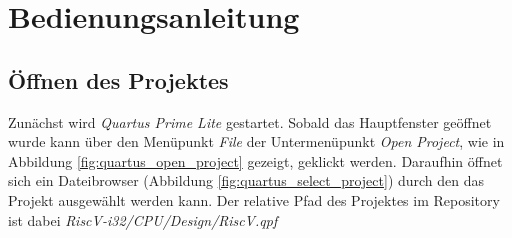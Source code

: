 \section{Bedienungsanleitung}

    \subsection{Öffnen des Projektes}
        Zunächst wird \textit{Quartus Prime Lite} gestartet.
        Sobald das Hauptfenster geöffnet wurde kann über den Menüpunkt \textit{File}
        der Untermenüpunkt \textit{Open Project}, wie in Abbildung \ref{fig:quartus_open_project} gezeigt,
        geklickt werden. Daraufhin öffnet sich ein Dateibrowser (Abbildung \ref{fig:quartus_select_project})
        durch den das Projekt ausgewählt werden kann.
        Der relative Pfad des Projektes im Repository ist dabei \textit{RiscV-i32/CPU/Design/RiscV.qpf}
        
